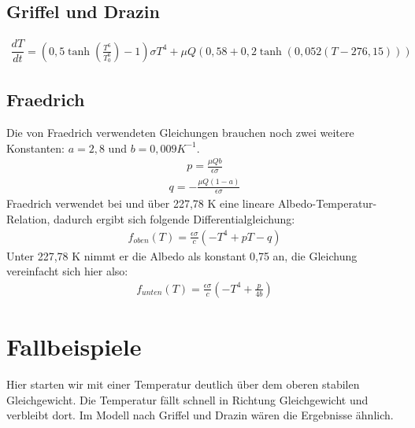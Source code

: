 \documentclass[]{report}
\begin{document}
\section{Griffel und Drazin}
	\begin{align}
		\dfrac{dT}{dt} = (0,5 \tanh\left(\frac{T^6}{T_0^6}\right)-1) \sigma T^4 + \mu Q (0,58 + 0,2 \tanh (0,052 (T - 276,15)))
	\end{align}
\section{Fraedrich}

Die von Fraedrich verwendeten Gleichungen brauchen noch zwei weitere Konstanten: $a=2,8$ und $b=0,009 K^{-1}$.
	\begin{align}
		p=\frac{\mu Q b}{\epsilon \sigma}
	\end{align}
	\begin{align}
		q = - \frac{\mu Q (1-a)}{\epsilon \sigma}
	\end{align}
	Fraedrich verwendet bei und über 227,78 K eine lineare Albedo-Temperatur-Relation, dadurch ergibt sich folgende Differentialgleichung:
	\begin{align}
		f_{oben}(T) = \frac{\epsilon \sigma}{c} (-T^4 + p T - q)
	\end{align}
	Unter 227,78 K nimmt er die Albedo als konstant 0,75 an, die Gleichung vereinfacht sich hier also:
	\begin{align}
		f_{unten}(T) = \frac{\epsilon \sigma}{c} (-T^4 + \frac{p}{4b})
	\end{align}
	

\chapter{Fallbeispiele}

\begin{figure} \centering \def\svgwidth{\columnwidth}  \end{figure}

Hier starten wir mit einer Temperatur deutlich über dem oberen stabilen Gleichgewicht. Die Temperatur fällt schnell in Richtung Gleichgewicht und verbleibt dort. Im Modell nach Griffel und Drazin wären die Ergebnisse ähnlich.

\begin{figure} \centering \def\svgwidth{\columnwidth}  \end{figure}
\end{document}
